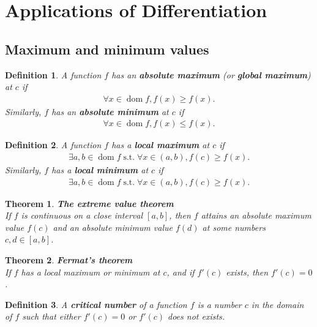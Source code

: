 \documentclass{article}
\DeclareMathOperator{\dom}{dom}
\DeclareMathOperator{\st}{s.t.}
\theoremstyle{sltheorem}
\newtheorem{definition}{Definition}[section]
\newtheorem{theorem}{Theorem}[section]
\begin{document}
\section{Applications of Differentiation}
\subsection{Maximum and minimum values}
\begin{definition}
    A function $f$ has an \textbf{absolute maximum} (or \textbf{global maximum}) at $c$ if
    \begin{align*}
        \forall x\in \dom f, f(x)\geq f(x).
    \end{align*} 
    Similarly, $f$ has an \textbf{absolute minimum} at $c$ if
    \begin{align*}
        \forall x\in \dom f, f(x)\leq f(x).
    \end{align*}
\end{definition}
\begin{definition}
    A function $f$ has a \textbf{local maximum} at $c$ if
    \begin{align*}
        \exists a,b\in \dom f \st \forall x\in (a,b), f(c)\geq f(x). 
    \end{align*}
    Similarly, $f$ has a \textbf{local minimum} at $c$ if
    \begin{align*}
        \exists a,b\in \dom f\st \forall x\in(a,b), f(c)\geq f(x).
    \end{align*}
\end{definition}
\begin{theorem}
    \textbf{The extreme value theorem}\\
    If $f$ is continuous on a close interval $[a,b]$, then $f$ attains an absolute maximum value $f(c)$ and an absolute minimum value $f(d)$ at some numbers $c,d\in[a,b]$.
\end{theorem}
\begin{theorem}
    \textbf{Fermat's theorem}\\
    If $f$ has a local maximum or minimum at $c$, and if $f'(c)$ exists, then $f'(c)=0$.
\end{theorem}
\begin{definition}
    A \textbf{critical number} of a function $f$ is a number $c$ in the domain of $f$ such that either $f'(c)=0$ or $f'(c)$ does not exists.
\end{definition}
\end{document}
